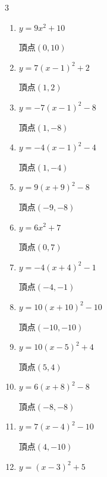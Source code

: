 \begin{multicols}{3}
\begin{enumerate}
  \item $\displaystyle y=9x^{2}+10$

        $\displaystyle 頂点\left( 0 , 10 \right)$

  \item $\displaystyle y=7\left( x-1\right)^{2}+2$

        $\displaystyle 頂点\left( 1 , 2 \right)$

  \item $\displaystyle y=-7\left( x-1\right)^{2}-8$

        $\displaystyle 頂点\left( 1 , -8 \right)$

\columnbreak %

  \item $\displaystyle y=-4\left( x-1\right)^{2}-4$

        $\displaystyle 頂点\left( 1 , -4 \right)$

  \item $\displaystyle y=9\left( x+9\right)^{2}-8$

        $\displaystyle 頂点\left( -9 , -8 \right)$

  \item $\displaystyle y=6x^{2}+7$

        $\displaystyle 頂点\left( 0 , 7 \right)$

  \item $\displaystyle y=-4\left( x+4\right)^{2}-1$

        $\displaystyle 頂点\left( -4 , -1 \right)$

  \item $\displaystyle y=10\left( x+10\right)^{2}-10$

        $\displaystyle 頂点\left( -10 , -10 \right)$

  \item $\displaystyle y=10\left( x-5\right)^{2}+4$

        $\displaystyle 頂点\left( 5 , 4 \right)$

  \item $\displaystyle y=6\left( x+8\right)^{2}-8$

        $\displaystyle 頂点\left( -8 , -8 \right)$

  \item $\displaystyle y=7\left( x-4\right)^{2}-10$

        $\displaystyle 頂点\left( 4 , -10 \right)$

  \item $\displaystyle y=\left( x-3\right)^{2}+5$


\end{enumerate}
\end{multicols}
